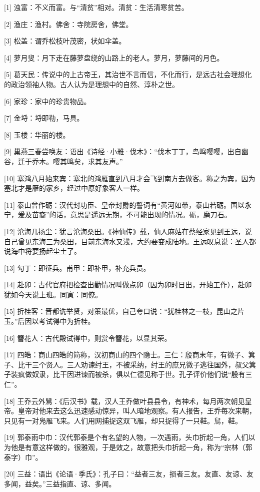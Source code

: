 \documentclass[12pt,UTF8]{ctexbook}
\begin{document}
[1] 浊富：不义而富。与“清贫”相对。清贫：生活清寒贫苦。

[2] 渔庄：渔村。佛舍：寺院房舍，佛堂。

[3] 松盖：谓乔松枝叶茂密，状如伞盖。

[4] 萝月叟：月下走在藤萝盘绕的山路上的老人。萝月，萝藤间的月色。

[5] 葛天民：传说中的上古帝王，其治世不言而信，不化而行，是远古社会理想化的政治领袖人物。古人认为是理想中的自然、淳朴之世。

[6] 家珍：家中的珍贵物品。

[7] 金埒：埒即勒，马具。

[8] 玉楼：华丽的楼。

[9] 巢燕三春尝唤友：语出《诗经·小雅·伐木》：“伐木丁丁，鸟鸣嘤嘤，出自幽谷，迁于乔木。嘤其鸣矣，求其友声。”

[10] 塞鸿八月始来宾：塞北的鸿雁直到八月才会飞到南方去做客。称之为宾，因为塞北才是雁的家乡，经过中原好象客人一样。

[11] 泰山曾作砺：汉代封功臣、皇帝封爵的誓词有“黄河如带，泰山若砺。国以永宁，爰及苗裔”的话，意思是遥远无期，不可能出现的情况。砺，磨刀石。

[12] 沧海几扬尘：犹言沧海桑田。《神仙传》载，仙人麻姑在蔡经家见到王远，说自己曾见东海三为桑田，目前东海水又浅，大约要变成陆地。王远叹息说：圣人都说海中将要扬起尘土了。

[13] 勾丁：即征兵。甫甲：即补甲，补充兵员。

[14] 赴卯：古代官府把检查出勤情况叫做点卯（因为卯时日出，开始工作），赴卯犹如今天说上班。同寅：同僚。

[15] 折桂客：晋都诜举贤，对策最优，自己夸口说：“犹桂林之一枝，昆山之片玉。”后因以考试得中为折桂。

[16] 簪花人：古代殿试得中，则赏令簪花，以显其荣。

[17] 四皓：商山四皓的简称，汉初商山的四个隐士。三仁：殷商末年，有微子、箕子、比干三个贤人。三人劝谏纣王，不被采纳，纣王的庶兄微子逃往国外，叔父箕子装疯做奴隶，比干因进谏而被杀，俱以仁德见称于世。孔子评价他们说“殷有三仁”。

[18] 王乔云外舃：《后汉书》载，汉人王乔做叶县县令，有神术，每月两次朝见皇帝。皇帝对他来去这么迅速感动惊异，叫人暗地观察。有人报告，王乔每次来朝，只见有一对凫雁飞来。人们用网捕捉这双飞雁，却只捉得了一只鞋。舃，鞋。

[19] 郭泰雨中巾：汉代郭泰是个有名望的人物，一次遇雨，头巾折起一角，人们以为他是有意这样做的，很雅观，于是效之，故意把头巾折起一角，称为“宗林（郭泰字）巾”。

[20] 三益：语出《论语·季氏》：孔子曰：“益者三友，损者三友。友直、友谅、友多闻，益矣。”三益指直、谅、多闻。
\end{document}
